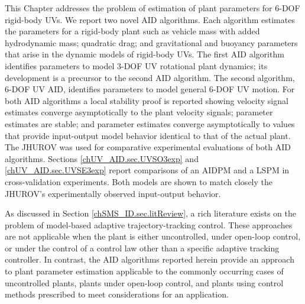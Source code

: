 
This Chapter addresses the problem of estimation of plant parameters
for 6-\ac{DOF} rigid-body \acp{UV}.
%
We report two novel \ac{AID} algorithms.  
% 
Each algorithm estimates the parameters for a rigid-body plant such
as vehicle mass with added hydrodynamic mass; quadratic drag; and 
gravitational and buoyancy parameters that arise in the
dynamic models of rigid-body \acp{UV}.
%
The first \ac{AID} algorithm identifies parameters to model 3-\ac{DOF}
\ac{UV} rotational plant dynamics; its development is a precursor to
the second \ac{AID} algorithm.
%
The second algorithm, 6-\ac{DOF} \acf{UV} \acf{AID}, identifies parameters to model
general 6-\ac{DOF} \ac{UV} motion.
% 
For both \ac{AID} algorithms a local stability proof is reported
showing velocity signal estimates converge asymptotically to the plant
velocity signals; parameter estimates are stable;
and parameter estimates converge asymptotically to values that provide
input-output model behavior identical to that of the actual plant.
%
The \ac{JHUROV} was used for comparative experimental evaluations of
both \ac{AID} algorithms.
%
Sections \ref{chUV_AID.sec.UVSO3exp} and \ref{chUV_AID.sec.UVSE3exp}
report comparisons of an \ac{AIDPM} and a \ac{LSPM} in cross-validation
experiments.
Both models are shown to match closely the \ac{JHUROV}'s
experimentally observed input-output behavior.


As discussed in Section \ref{chSMS_ID.sec.litReview}, a rich
literature exists on the problem of model-based adaptive
trajectory-tracking control.
%
These approaches are not applicable when the plant is either
uncontrolled, under open-loop control, or under the control of a
control law other than a specific adaptive tracking controller.
%
In contrast, the \ac{AID} algorithms reported herein provide an
approach to plant parameter estimation applicable to the commonly
occurring cases of uncontrolled plants, plants under open-loop
control, and plants using control methods prescribed to meet
considerations for an application.


